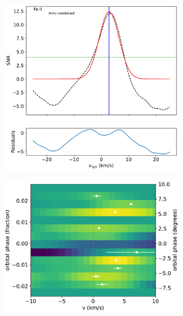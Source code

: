 \documentclass[twocolumn]{aastex631}
\begin{document}
\begin{figure}[ht!]
\begin{subfigure}[b]{0.333\textwidth}
            \end{subfigure}
            \begin{subfigure}[b]{0.333\textwidth}\label{fig:1d-ccf-Fe+-combined}
                \includegraphics[width=\textwidth]{plots-updated/line-profile/combined/KELT-20b.20190504.combined.Fe+.SNR-Gaussian.pdf}
                
            \end{subfigure}
            \begin{subfigure}[b]{0.333\textwidth}\label{fig:wind-chars-Fe+-combined}
                \includegraphics[width=\textwidth]{plots-updated/line-velocity/binned/pcolor/points/KELT-20b.Fe+.phase-binned+RVs.pdf}
                

\end{subfigure}
\end{figure}
\end{document}
